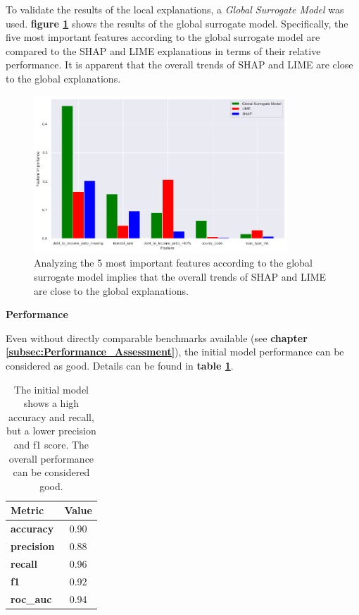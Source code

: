 To validate the results of the local explanations, a \textit{Global Surrogate Model} was used. \textbf{figure \ref{fig:Global_Surrogate}} shows the results of the global surrogate model. Specifically, the five most important features according to the global surrogate model are compared to the SHAP and LIME explanations in terms of their relative performance.
It is apparent that the overall trends of SHAP and LIME are close to the global explanations.

\begin{figure}[h]
    \centering
    \includegraphics[width=0.85\textwidth]{images/CHXX_UPDATE_Surrogate_SHAP_LIME_combined.png}
    \caption{Global Surrogate Model compared to SHAP and LIME}
    \caption*{Analyzing the 5 most important features according to the global surrogate model implies that the overall trends of SHAP and LIME are close to the global explanations.}
    \label{fig:Global_Surrogate}
\end{figure}

\textbf{Performance}

Even without directly comparable benchmarks available (see \textbf{chapter \ref{subsec:Performance_Assessment}}), the initial model performance can be considered as good. Details can be found in \textbf{table \ref{tab:initial_model_performance_results_1}}.

\begin{table}[h]
    \centering
    \begin{tabular}{l c}
    \toprule
    \textbf{Metric} & \textbf{Value} \\
    \midrule
    \textbf{accuracy} & 0.90 \\
    \textbf{precision} & 0.88 \\
    \textbf{recall} & 0.96 \\
    \textbf{f1} & 0.92 \\
    \textbf{roc\_auc} & 0.94 \\
    \bottomrule
    \end{tabular}
    \caption{Metrics \#1: Initial Model}
    \caption*{The initial model shows a high accuracy and recall, but a lower precision and f1 score. The overall performance can be considered good.}
    \label{tab:initial_model_performance_results_1}
\end{table}

